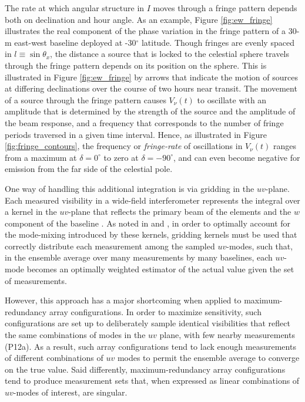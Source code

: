 \documentclass[twocolumn,apj,numberedappendix]{emulateapj}
\begin{document}
The rate at which angular structure in $I$ moves through a fringe pattern depends both on declination
and hour angle.  As an example, Figure \ref{fig:ew_fringe} illustrates the real component of the phase
variation in the fringe pattern of a 30-m east-west baseline deployed at -30$^\circ$ latitude.
Though fringes are evenly spaced in $l\equiv\sin\theta_x$, the distance a source that is locked to the celestial
sphere travels through the fringe pattern depends on its position on the sphere. This is illustrated in Figure
\ref{fig:ew_fringe} by arrows that indicate the motion of sources at differing declinations over the course
of two hours near transit.  The movement of a source through the fringe pattern causes $V_\nu(t)$ to oscillate
with an amplitude that is determined by the strength of the source and the amplitude of the beam response,
and a frequency that corresponds to the number of fringe periods traversed in a given time interval.  Hence,
as illustrated in Figure \ref{fig:fringe_contours}, the frequency or {\it fringe-rate} of oscillations in $V_\nu(t)$
ranges from a maximum at $\delta=0^\circ$ to zero at $\delta=-90^\circ$, and can even become negative
for emission from the far side of the celestial pole.


One way of handling this additional integration is via gridding in the $uv$-plane.
Each measured visibility in a wide-field interferometer represents the integral over a kernel in
the $uv$-plane that reflects the primary beam of the elements \citep{bhatnagar_et_al2008,morales_matejek2009} and the $w$ component 
of the baseline \citep{cornwell_et_al2003}.  As noted in
\citet{sullivan_et_al2012} and \citet{morales_matejek2009},
in order to optimally account for the mode-mixing introduced by these kernels, gridding kernels must be
used that correctly distribute each measurement among the sampled $uv$-modes, such that, in the ensemble average
over many measurements by many baselines, each $uv$-mode becomes an optimally weighted estimator of the actual
value given the set of measurements.

However, this approach has a major shortcoming when applied to maximum-redundancy array configurations.
In order
to maximize sensitivity, such
configurations are set up to deliberately sample identical visibilities that reflect the same 
combinations of modes in the $uv$ plane, with few nearby measurements (P12a).  As a result,
such array configurations tend to lack enough measurements of different combinations of $uv$ modes
to permit the ensemble average to converge on the true value.  Said differently, maximum-redundancy
array configurations tend to produce measurement sets that, when expressed as linear combinations
of $uv$-modes of interest, are singular.
\end{document}
